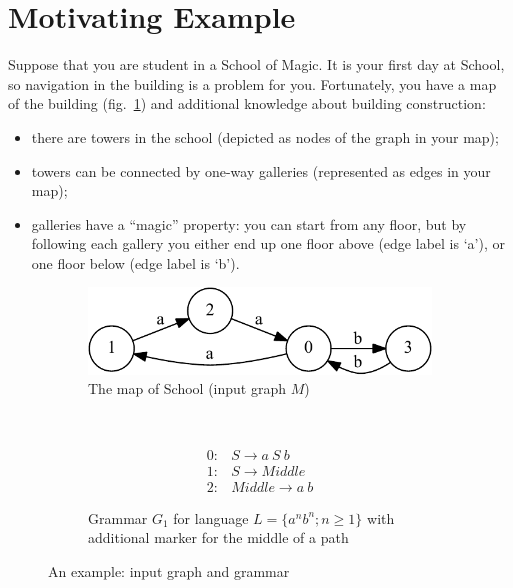 \section{Motivating Example}\label{motivExample}

Suppose that you are student in a School of Magic.
It is your first day at School, so navigation in the building is a problem for you.
Fortunately, you have a map of the building (fig.~\ref{input}) and additional knowledge about building construction:
\begin{itemize}
  \item there are towers in the school (depicted as nodes of the graph in your map);
  \item towers can be connected by one-way galleries (represented as edges in your map);
  \item galleries have a ``magic'' property: you can start from any floor, but by following each gallery you either end up one floor above (edge label is `a'), or one floor below (edge label is `b'). 
\end{itemize}

\begin{figure}[h]
    \begin{center}
	\centering
    \begin{subfigure}[b]{0.45\textwidth}
        \includegraphics[width=\textwidth]{dot/input.pdf}
        \caption{The map of School (input graph $M$)}
        \label{input}        
		\vspace{1cm}
	\end{subfigure}
	~	
	\begin{subfigure}[b]{0.45\textwidth}
   \[
\begin{array}{rl}
   0:& S \rightarrow a \ S \ b \\
   1:& S \rightarrow Middle \\
   2:& Middle \rightarrow a \ b
\end{array}
\]
   \caption{Grammar $G_1$ for language $L=\{a^n b^n; n \geq 1\}$ with additional marker for the middle of a path}
   \label{grammarG}        
	\end{subfigure}
    \end{center}
\label{exampleData}
\caption{An example: input graph and grammar}
\end{figure}


